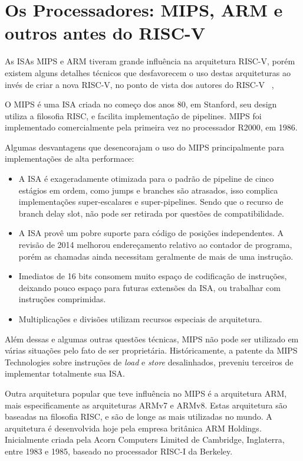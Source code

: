 	\section{Os Processadores: MIPS, ARM e outros antes do RISC-V}

		As ISAs MIPS e ARM tiveram grande influência na arquitetura RISC-V, porém existem alguns detalhes técnicos que desfavorecem o uso destas arquiteturas ao invés de criar a nova RISC-V, no ponto de vista dos autores do RISC-V ~\cite{Waterman:EECS-2016-1},

		O MIPS é uma ISA criada no começo dos anos 80, em Stanford, seu design utiliza a filosofia RISC, e facilita implementação de pipelines. MIPS foi implementado comercialmente pela primeira vez no processador R2000, em 1986.

		Algumas desvantagens que desencorajam o uso do MIPS principalmente para implementações de alta performace:
		\begin{itemize}
			\item A ISA é exageradamente otimizada para o padrão de pipeline de cinco estágios em ordem, como jumps e branches são atrasados, isso complica implementações super-escalares e super-pipelines. Sendo que o recurso de branch delay slot, não pode ser retirada por questões de compatibilidade.

			\item A ISA provê um pobre suporte para código de posições independentes. A revisão de 2014 melhorou endereçamento relativo ao contador de programa, porém as chamadas ainda necessitam geralmente de mais de uma instrução.

			\item Imediatos de 16 bits consomem muito espaço de codificação de instruções, deixando pouco espaço para futuras extensões da ISA, ou trabalhar com instruções comprimidas.

			\item Multiplicações e divisões utilizam recursos especiais de arquitetura.
		\end{itemize}

		Além dessas e algumas outras questões técnicas, MIPS não pode ser utilizado em várias situações pelo fato de ser proprietária. Históricamente, a patente da MIPS Technologies sobre instruções de \textit{load} e \textit{store} desalinhados, preveniu terceiros de implementar totalmente sua ISA.

		Outra arquitetura popular que teve influência no MIPS é a arquitetura ARM, mais especificamente as arquiteturas ARMv7 e ARMv8. Estas arquitetura são baseadas na filosofia RISC, e são de longe as mais utilizadas no mundo. A arquitetura é desenvolvida hoje pela empresa britânica ARM Holdings. Inicialmente criada pela Acorn Computers Limited de Cambridge, Inglaterra, entre 1983 e 1985, baseado no processador RISC-I da Berkeley.

